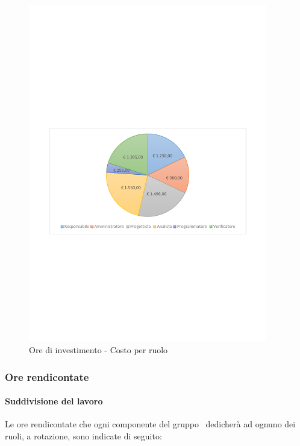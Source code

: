 \documentclass[../PianoProgetto.tex]{subfiles}
\begin{document}
	\begin{figure}[!h]
		\centering
		\includegraphics[width=0.93\textwidth , trim=2cm 9.5cm 2cm 11cm]{grafici/Riepilogo/Investimento/costo}
			\caption{Ore di investimento - Costo per ruolo}
		\label{fig:CircleChart-investimento_costo}
	\end{figure}
\vfill	

	\subsubsection{Ore rendicontate}
				\paragraph{Suddivisione del lavoro}
					Le ore rendicontate che ogni componente del gruppo \leaf\ dedicherà ad ognuno dei ruoli, a rotazione, sono indicate di seguito:
	
\end{document}
